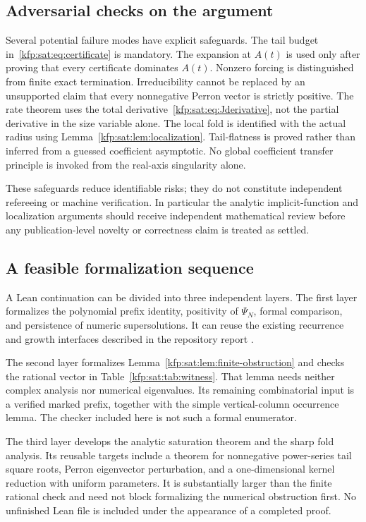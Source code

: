 \documentclass[11pt,a4paper]{article}
\theoremstyle{definition}
\theoremstyle{remark}
\begin{document}
\subsection{Adversarial checks on the argument}
Several potential failure modes have explicit safeguards. The tail budget
in~\eqref{kfp:sat:eq:certificate} is mandatory. The expansion at $A(t)$ is used
only after proving that every certificate dominates $A(t)$. Nonzero
forcing is distinguished from finite exact termination. Irreducibility
cannot be replaced by an unsupported claim that every nonnegative
Perron vector is strictly positive. The rate theorem uses the total
derivative~\eqref{kfp:sat:eq:Jderivative}, not the partial derivative in the size
variable alone. The local fold is identified with the actual radius using
Lemma~\ref{kfp:sat:lem:localization}. Tail-flatness is proved rather than inferred
from a guessed coefficient asymptotic. No global coefficient transfer
principle is invoked from the real-axis singularity alone.

These safeguards reduce identifiable risks; they do not constitute
independent refereeing or machine verification. In particular the
analytic implicit-function and localization arguments should receive
independent mathematical review before any publication-level novelty or
correctness claim is treated as settled.

\subsection{A feasible formalization sequence}
A Lean continuation can be divided into three independent layers. The
first layer formalizes the polynomial prefix identity, positivity of
$\Psi_N$, formal comparison, and persistence of numeric supersolutions.
It can reuse the existing recurrence and growth interfaces described in
the repository report \cite{satprefix,satformal}.

The second layer formalizes Lemma~\ref{kfp:sat:lem:finite-obstruction} and checks
the rational vector in Table~\ref{kfp:sat:tab:witness}. That lemma needs neither
complex analysis nor numerical eigenvalues. Its remaining combinatorial
input is a verified marked prefix, together with the simple vertical-column
occurrence lemma. The checker included here is not such a formal
enumerator.

The third layer develops the analytic saturation theorem and the sharp
fold analysis. Its reusable targets include a theorem for nonnegative
power-series tail square roots, Perron eigenvector perturbation, and a
one-dimensional kernel reduction with uniform parameters. It is
substantially larger than the finite rational check and need not block
formalizing the numerical obstruction first. No unfinished Lean file is
included under the appearance of a completed proof.
\end{document}
